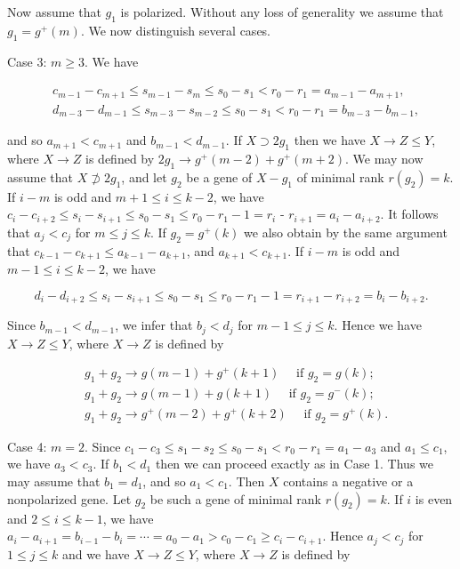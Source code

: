 \documentclass[10pt]{article}
\begin{document}
Now assume that $g_{1}$ is polarized. Without any loss of generality we assume that $g_{1}=g^{+}(m)$. We now distinguish several cases.

Case 3: $m \geqslant 3$. We have

$$
\begin{aligned}
& c_{m-1}-c_{m+1} \leqslant s_{m-1}-s_{m} \leqslant s_{0}-s_{1}<r_{0}-r_{1}=a_{m-1}-a_{m+1}, \\
& d_{m-3}-d_{m-1} \leqslant s_{m-3}-s_{m-2} \leqslant s_{0}-s_{1}<r_{0}-r_{1}=b_{m-3}-b_{m-1},
\end{aligned}
$$

and so $a_{m+1}<c_{m+1}$ and $b_{m-1}<d_{m-1}$. If $X \supset 2 g_{1}$ then we have $X \rightarrow Z \leqslant Y$, where $X \rightarrow Z$ is defined by $2 g_{1} \rightarrow g^{+}(m-2)+g^{+}(m+2)$. We may now assume that $X \not \supset 2 g_{1}$, and let $g_{2}$ be a gene of $X-g_{1}$ of minimal rank $r\left(g_{2}\right)=k$. If $i-m$ is odd and $m+1 \leqslant i \leqslant k-2$, we have $c_{i}-c_{i+2} \leqslant s_{i}-s_{i+1} \leqslant s_{0}-s_{1} \leqslant r_{0}-r_{1}-1=r_{i}$ - $r_{i+1}=a_{i}-a_{i+2}$. It follows that $a_{j}<c_{j}$ for $m \leqslant j \leqslant k$. If $g_{2}=g^{+}(k)$ we also obtain by the same argument that $c_{k-1}-c_{k+1} \leqslant a_{k-1}-a_{k+1}$, and $a_{k+1}<c_{k+1}$. If $i-m$ is odd and $m-1 \leqslant i \leqslant k-2$, we have

$$
d_{i}-d_{i+2} \leqslant s_{i}-s_{i+1} \leqslant s_{0}-s_{1} \leqslant r_{0}-r_{1}-1=r_{i+1}-r_{i+2}=b_{i}-b_{i+2} .
$$

Since $b_{m-1}<d_{m-1}$, we infer that $b_{j}<d_{j}$ for $m-1 \leqslant j \leqslant k$. Hence we have $X \rightarrow Z \leqslant Y$, where $X \rightarrow Z$ is defined by

$$
\begin{aligned}
& g_{1}+g_{2} \rightarrow g(m-1)+g^{+}(k+1) \quad \text { if } g_{2}=g(k) ; \\
& g_{1}+g_{2} \rightarrow g(m-1)+g(k+1) \quad \text { if } g_{2}=g^{-}(k) ; \\
& g_{1}+g_{2} \rightarrow g^{+}(m-2)+g^{+}(k+2) \quad \text { if } g_{2}=g^{+}(k) .
\end{aligned}
$$

Case 4: $m=2$. Since $c_{1}-c_{3} \leqslant s_{1}-s_{2} \leqslant s_{0}-s_{1}<r_{0}-r_{1}=a_{1}-a_{3}$ and $a_{1} \leqslant c_{1}$, we have $a_{3}<c_{3}$. If $b_{1}<d_{1}$ then we can proceed exactly as in Case 1. Thus we may assume that $b_{1}=d_{1}$, and so $a_{1}<c_{1}$. Then $X$ contains a negative or a nonpolarized gene. Let $g_{2}$ be such a gene of minimal rank $r\left(g_{2}\right)=k$. If $i$ is even and $2 \leqslant i \leqslant k-1$, we have $a_{i}-a_{i+1}=b_{i-1}-b_{i}=\cdots=a_{0}-a_{1}>c_{0}-c_{1} \geqslant c_{i}-c_{i+1}$. Hence $a_{j}<c_{j}$ for $1 \leqslant j \leqslant k$ and we have $X \rightarrow Z \leqslant Y$, where $X \rightarrow Z$ is defined by
\end{document}
